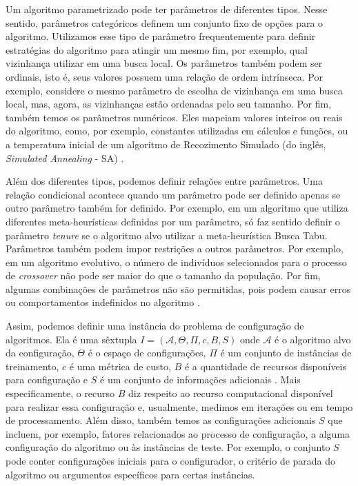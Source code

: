 Um algoritmo parametrizado pode ter parâmetros de diferentes tipos. Nesse sentido, parâmetros categóricos definem um conjunto fixo de opções para o algoritmo. Utilizamos esse tipo de parâmetro frequentemente para definir estratégias do algoritmo para atingir um mesmo fim, por exemplo, qual vizinhança utilizar em uma busca local. Os parâmetros também podem ser ordinais, isto é, seus valores possuem uma relação de ordem intrínseca. Por exemplo, considere o mesmo parâmetro de escolha de vizinhança em uma busca local, mas, agora, as vizinhanças estão ordenadas pelo seu tamanho. Por fim, também temos os parâmetros numéricos. Eles mapeiam valores inteiros ou reais do algoritmo, como, por exemplo, constantes utilizadas em cálculos e funções, ou a temperatura inicial de um algoritmo de Recozimento Simulado (do inglês, \textit{Simulated Annealing} - \acs{SA}) \citep{lopez2016irace}.

Além dos diferentes tipos, podemos definir relações entre parâmetros. Uma relação condicional acontece quando um parâmetro pode ser definido apenas se outro parâmetro também for definido. Por exemplo, em um algoritmo que utiliza diferentes meta-heurísticas definidas por um parâmetro, só faz sentido definir o parâmetro \textit{tenure} se o algoritmo alvo utilizar a meta-heurística Busca Tabu. Parâmetros também podem impor restrições a outros parâmetros. Por exemplo, em um algoritmo evolutivo, o número de indivíduos selecionados para o processo de \textit{crossover} não pode ser maior do que o tamanho da população. Por fim, algumas combinações de parâmetros não são permitidas, pois podem causar erros ou comportamentos indefinidos no algoritmo \citep{lopez2016irace}.

Assim, podemos definir uma instância do problema de configuração de algoritmos. Ela é uma sêxtupla $I=(\mathcal{A}, \Theta, \Pi, c , B, S)$ onde $\mathcal{A}$ é o algoritmo alvo da configuração, $\Theta$ é o espaço de configurações, $\Pi$ é um conjunto de instâncias de treinamento, $c$ é uma métrica de custo, $B$ é a quantidade de recursos disponíveis para configuração e $S$ é um conjunto de informações adicionais \citep{hutter2009paramils}. Mais especificamente, o recurso $B$ diz respeito ao recurso computacional disponível para realizar essa configuração e, usualmente, medimos em iterações ou em tempo de processamento. Além disso, também temos as configurações adicionais $S$ que incluem, por exemplo, fatores relacionados ao processo de configuração, a alguma configuração do algoritmo ou às instâncias de teste. Por exemplo, o conjunto $S$ pode conter configurações iniciais para o configurador, o critério de parada do algoritmo ou argumentos específicos para certas instâncias.


